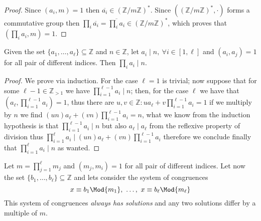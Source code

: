 \begin{proof}
    Since \((a_i, m) = 1\) then  \(\overline{a_i} \in
    (\mathbb{Z}/m\mathbb{Z})^\ast\). Since \(((\mathbb{Z}/m\mathbb{Z})^\ast,
    \cdot)\) forms a commutative group then \(\prod_{i} \overline{a_i} =
    \overline{\prod_i a_i} \in (\mathbb{Z}/m\mathbb{Z})^\ast\), which proves that
    \((\prod_i a_i, m) = 1\).
\end{proof}

\begin{lemma}\label{ChiRemLem2}
    Given the set \(\{a_1, \dots, a_\ell\} \subseteq \mathbb{Z}\) and \(n \in
    \mathbb{Z}\), let \(a_i \mid n,\ \forall i \in [1, \ell]\) and \((a_i, a_j) =
    1\) for all pair of different indices. Then  \(\prod_i a_i \mid n\).
\end{lemma}

\begin{proof}
    We prove via induction. For the case \(\ell = 1\) is trivial; now suppose
    that for some \(\ell-1 \in \mathbb{Z}_{>1}\) we have
    \(\prod_{i=1}^{\ell-1}a_i \mid n\); then, for the case \(\ell\) we have that
    \((a_\ell, \prod_{i=1}^{\ell-1} a_i)=1\), thus there are \(u, v \in
    \mathbb{Z} : u a_\ell + v\prod_{i=1}^{\ell-1}a_i = 1\) if we multiply by
    \(n\) we find \((un) a_\ell + (vn) \prod_{i=1}^{\ell-1} a_i = n\), what we
    know from the induction hypothesis is that \(\prod_{i=1}^{\ell-1}a_i \mid n\)
    but also \(a_\ell \mid a_\ell\) from the reflexive property of division thus
    \(\prod_{i=1}^\ell a_i \mid (un) a_\ell + (vn) \prod_{i=1}^{\ell-1} a_i\)
    therefore we conclude finally that \(\prod_{i=1}^\ell a_i \mid n\) as wanted.
\end{proof}

\begin{theorem}
    Let \(m = \prod_{j=1}^\ell m_j\) and \((m_j, m_i) = 1\) for all pair of
    different indices. Let now the set \(\{b_1, \dots, b_\ell\} \subseteq
    \mathbb{Z}\) and lets consider the system of congruences
    \[
        x \equiv b_1 \Mod{m_1},\ \dots,\ x \equiv b_\ell \Mod{m_\ell}
    \]
    This system of congruences \emph{always has solutions} and any two solutions
    differ by a multiple of \(m\).
\end{theorem}

